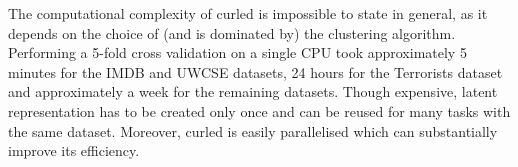The computational complexity of \gls{curled} is impossible to state in general, as it depends on the choice of (and is dominated by) the clustering algorithm.
Performing a 5-fold cross validation on a single CPU took approximately 5 minutes for the IMDB and UWCSE datasets, 24 hours for the Terrorists dataset and approximately a week for the remaining datasets.
Though expensive, latent representation has to be created only once and can be reused for many tasks with the same dataset.
Moreover, \gls{curled} is easily parallelised which can substantially improve its efficiency.


\begin{table}[t]
\captionsetup{justification=centerlast}
\centering
\footnotesize
\caption[Number of clusters in various $\mathcal{C}$-representations]{Number of clusters in various $\mathcal{C}$-representations. M indicates MRC, while S and H indicate \gls{curled} representations with spectral and hierarchical clustering, respectively. Vocabulary sizes obtained with \textit{merging} and \textit{combination} similarities were similar, so only the one for merging is reported. }
\end{table}
